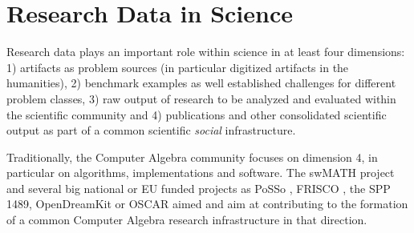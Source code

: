 \documentclass[12pt]{article}
\begin{document}
\section{Research Data in Science}

Research data plays an important role within science in at least four
dimensions: 1) artifacts as problem sources (in particular digitized artifacts
in the humanities), 2) benchmark examples as well established challenges for
different problem classes, 3) raw output of research to be analyzed and
evaluated within the scientific community and 4) publications and other
consolidated scientific output as part of a common scientific \emph{social}
infrastructure.

Traditionally, the Computer Algebra community focuses on dimension 4, in
particular on algorithms, implementations and software.  The swMATH project
\cite{swmath} and several big national or EU funded projects as PoSSo
\cite{PoSSo}, FRISCO \cite{FRISCO}, the SPP 1489, OpenDreamKit \cite{odk} or
OSCAR \cite{oscar} aimed and aim at contributing to the formation of a common
Computer Algebra research infrastructure in that direction.
\end{document}
